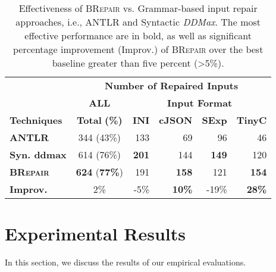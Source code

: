\documentclass[sigconf,review,anonymous]{acmart}
\newcounter{todocounter}
\newcommand{\todo}[1]{\marginpar{$|$}\textcolor{red}{\stepcounter{todocounter}\footnote[\thetodocounter]{\textcolor{red}{\textbf{TODO }}\textit{#1}}}}
\renewcommand{\todo}[1]{}
\newcommand{\approach}{\textsc{BRepair}\xspace}
\newcommand{\ddmax}{\textit{DDMax}\xspace}
\begin{document}
\begin{table}[!tbp]\centering
\caption{Effectiveness of \approach vs. Grammar-based input repair approaches, i.e.,  ANTLR and Syntactic \ddmax. The most effective performance are in bold, as well as significant percentage improvement (Improv.) of \approach over the best baseline greater than five percent (>5\%). }
\begin{tabular}{|l | c | r  r  r  r |}
\hline
&  \multicolumn{5}{c|}{\textbf{Number of Repaired Inputs}}  \\
&  \multicolumn{1}{c|}{\textbf{ALL}} & \multicolumn{4}{c|}{\textbf{Input Format}}  \\
\textbf{Techniques} & \textbf{Total} \textbf{(\%)} & \textbf{INI} & \textbf{cJSON} & \textbf{SExp} & \textbf{TinyC} \\
\hline
\textbf{ANTLR} & 344 (43\%) & 133 & 69 & 96 &  46   \\
\textbf{Syn. ddmax} & 614 (76\%) & \textbf{201}  & 144  & \textbf{149}  & 120  \\ 	
\hline
\textbf{\approach}  & \textbf{624} (\textbf{77\%}) & 191 & \textbf{158}  & 121  &  \textbf{154} \\
\hline
\textbf{Improv.} &  2\%  & -5\% & \textbf{10\%} & -19\% & \textbf{28\%} \\
\hline
\end{tabular}
\label{tab:effectiveness-grammar}
\end{table}



\section{Experimental Results}
\label{sec:results}

In this section, we
discuss the %
results
of our empirical evaluations.

\end{document}
